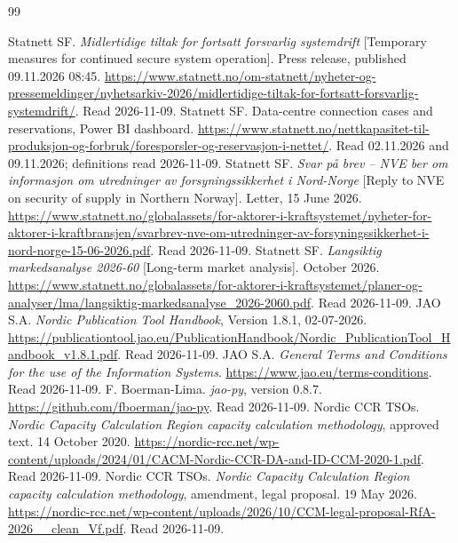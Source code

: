 \begin{thebibliography}{99}
\raggedright
{} Statnett SF. \emph{Midlertidige tiltak for fortsatt forsvarlig systemdrift} [Temporary measures for continued secure system operation]. Press release, published 09.11.2026 08:45. \url{https://www.statnett.no/om-statnett/nyheter-og-pressemeldinger/nyhetsarkiv-2026/midlertidige-tiltak-for-fortsatt-forsvarlig-systemdrift/}. Read 2026-11-09. %
 Statnett SF. Data-centre connection cases and reservations, Power BI dashboard. \url{https://www.statnett.no/nettkapasitet-til-produksjon-og-forbruk/foresporsler-og-reservasjon-i-nettet/}. Read 02.11.2026 and 09.11.2026; definitions read 2026-11-09. %
 Statnett SF. \emph{Svar på brev -- NVE ber om informasjon om utredninger av forsyningssikkerhet i Nord-Norge} [Reply to NVE on security of supply in Northern Norway]. Letter, 15 June 2026. \url{https://www.statnett.no/globalassets/for-aktorer-i-kraftsystemet/nyheter-for-aktorer-i-kraftbransjen/svarbrev-nve-om-utredninger-av-forsyningssikkerhet-i-nord-norge-15-06-2026.pdf}. Read 2026-11-09. %
 Statnett SF. \emph{Langsiktig markedsanalyse 2026-60} [Long-term market analysis]. October 2026. \url{https://www.statnett.no/globalassets/for-aktorer-i-kraftsystemet/planer-og-analyser/lma/langsiktig-markedsanalyse_2026-2060.pdf}. Read 2026-11-09. %
 JAO S.A. \emph{Nordic Publication Tool Handbook}, Version 1.8.1, 02-07-2026. \url{https://publicationtool.jao.eu/PublicationHandbook/Nordic_PublicationTool_Handbook_v1.8.1.pdf}. Read 2026-11-09. %
 JAO S.A. \emph{General Terms and Conditions for the use of the Information Systems}. \url{https://www.jao.eu/terms-conditions}. Read 2026-11-09. %
 F. Boerman-Lima. \emph{jao-py}, version 0.8.7. \url{https://github.com/fboerman/jao-py}. Read 2026-11-09. %
 Nordic CCR TSOs. \emph{Nordic Capacity Calculation Region capacity calculation methodology}, approved text. 14 October 2020. \url{https://nordic-rcc.net/wp-content/uploads/2024/01/CACM-Nordic-CCR-DA-and-ID-CCM-2020-1.pdf}. Read 2026-11-09. %
 Nordic CCR TSOs. \emph{Nordic Capacity Calculation Region capacity calculation methodology}, amendment, legal proposal. 19 May 2026. \url{https://nordic-rcc.net/wp-content/uploads/2026/10/CCM-legal-proposal-RfA-2026__clean_Vf.pdf}. Read 2026-11-09. %

\end{thebibliography}

